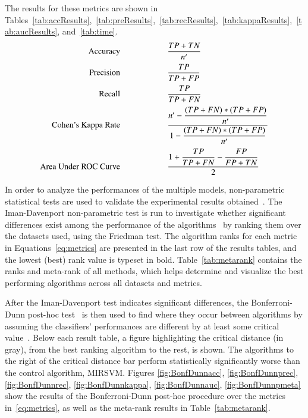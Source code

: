 \documentclass[preprint,12pt]{elsarticle}
\newcommand\tab[1][1cm]{\hspace*{#1}}
\begin{document}
The results for these metrics are shown in Tables~\ref{tab:accResults},~\ref{tab:preResults},~\ref{tab:recResults},~\ref{tab:kappaResults},~\ref{tab:aucResults}, and~\ref{tab:time}.
\begin{subequations}
\label{eq:metrics}
\begin{align}
\text{Accuracy} \tab \tab &\dfrac{TP+TN}{n^\prime} \label{eq:accuracy}\\[1.5pt]
\text{Precision} \tab \tab &\dfrac{TP}{TP+FP} \label{eq:precision}\\[1.5pt]
\text{Recall} \tab \tab &\dfrac{TP}{TP+FN} \label{eq:recall}\\[1.5pt]
\text{Cohen's Kappa Rate} \tab \tab &\dfrac{n^\prime - \dfrac{(TP+FN)*(TP+FP)}{n^\prime}}{1 - \dfrac{(TP+FN)*(TP+FP)}{n^\prime}} \label{eq:kappa}\\[1.5pt]
\text{Area Under ROC Curve} \tab \tab &\frac{1 + \dfrac{TP}{TP+FN} - \dfrac{FP}{FP+TN}}{2} \label{eq:auc}
\end{align}
\end{subequations}

In order to analyze the performances of the multiple models, non-parametric statistical tests are used to validate the experimental results obtained~\citep{Derrac2011,Garcia20102044}. The Iman-Davenport non-parametric test is run to investigate whether significant differences exist among the performance of the algorithms~\citep{Garcia2008} by ranking them over the datasets used, using the Friedman test. The algorithm ranks for each metric in Equations~\eqref{eq:metrics} are presented in the last row of the results tables, and the lowest (best) rank value is typeset in bold. Table~\ref{tab:metarank} contains the ranks and meta-rank of all methods, which helps determine and visualize the best performing algorithms across all datasets and metrics. 

After the Iman-Davenport test indicates significant differences, the Bonferroni-Dunn post-hoc test~\citep{Dunn1961} is then used to find where they occur between algorithms by assuming the classifiers' performances are different by at least some critical value~\citep{Garcia2009}. Below each result table, a figure highlighting the critical distance (in gray), from the best ranking algorithm to the rest, is shown. The algorithms to the right of the critical distance bar perform statistically significantly worse than the control algorithm, MIRSVM. Figures \ref{fig:BonfDunnacc}, \ref{fig:BonfDunnprec}, \ref{fig:BonfDunnrec}, \ref{fig:BonfDunnkappa}, \ref{fig:BonfDunnauc}, \ref{fig:BonfDunnpmeta} show the results of the Bonferroni-Dunn post-hoc procedure over the metrics in~\eqref{eq:metrics}, as well as the meta-rank results in Table~\ref{tab:metarank}.
\end{document}
